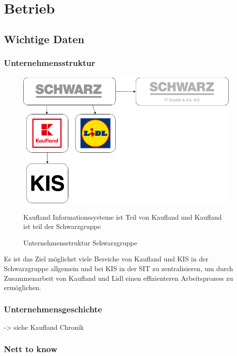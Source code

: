\chapter{Betrieb}

\section{Wichtige Daten}

\subsection{Unternehmensstruktur}

\begin{figure}[H]
    \centering
    \includegraphics[width=\textwidth]{include/images/Unternehmensstruktur.png}
    \caption{Unternehmensstruktur Schwarzgruppe}
    \small Kaufland Informationssysteme ist Teil von Kaufland und Kaufland ist teil der Schwarzgruppe
    \label{fig-Schwarzgruppe}
\end{figure}


Es ist das Ziel möglichst viele Bereiche von Kaufland und KIS in der Schwarzgruppe allgemein und bei KIS in der SIT zu zentralisieren, um durch Zusammenarbeit von Kaufland und Lidl einen effizienteren Arbeitsprozess zu ermöglichen. 

\subsection{Unternehmensgeschichte}

-> siehe Kaufland Chronik 

\subsection{Nett to know}

